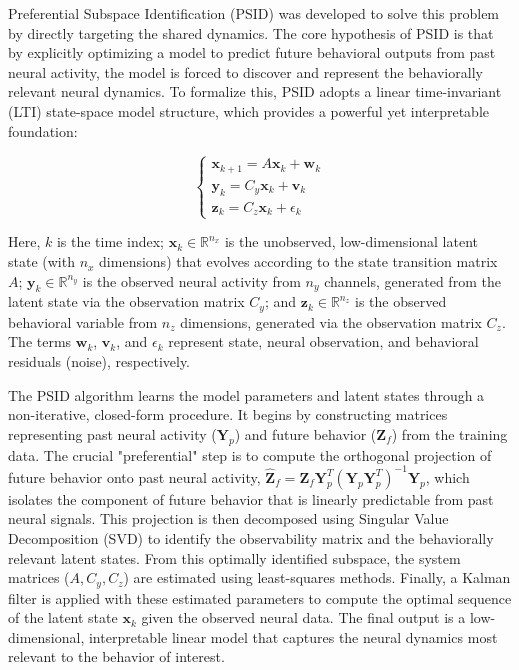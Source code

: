 \documentclass[12pt, a4paper]{article}
\begin{document}
Preferential Subspace Identification (PSID) was developed to solve this problem by directly targeting the shared dynamics. The core hypothesis of PSID is that by explicitly optimizing a model to predict future behavioral outputs from past neural activity, the model is forced to discover and represent the behaviorally relevant neural dynamics. To formalize this, PSID adopts a linear time-invariant (LTI) state-space model structure, which provides a powerful yet interpretable foundation:

$$
\begin{cases}
\mathbf{x}_{k+1} = A \mathbf{x}_k + \mathbf{w}_k \\
\mathbf{y}_k = C_y \mathbf{x}_k + \mathbf{v}_k \\
\mathbf{z}_k = C_z \mathbf{x}_k + \epsilon_k
\end{cases}
$$

Here, $k$ is the time index; $\mathbf{x}_k \in \mathbb{R}^{n_x}$ is the unobserved, low-dimensional latent state (with $n_x$ dimensions) that evolves according to the state transition matrix $A$; $\mathbf{y}_k \in \mathbb{R}^{n_y}$ is the observed neural activity from $n_y$ channels, generated from the latent state via the observation matrix $C_y$; and $\mathbf{z}_k \in \mathbb{R}^{n_z}$ is the observed behavioral variable from $n_z$ dimensions, generated via the observation matrix $C_z$. The terms $\mathbf{w}_k$, $\mathbf{v}_k$, and $\epsilon_k$ represent state, neural observation, and behavioral residuals (noise), respectively.

The PSID algorithm learns the model parameters and latent states through a non-iterative, closed-form procedure. It begins by constructing  matrices representing past neural activity ($\mathbf{Y}_p$) and future behavior ($\mathbf{Z}_f$) from the training data. The crucial "preferential" step is to compute the orthogonal projection of future behavior onto past neural activity, $\hat{\mathbf{Z}}_f = \mathbf{Z}_f \mathbf{Y}_p^T (\mathbf{Y}_p \mathbf{Y}_p^T)^{-1} \mathbf{Y}_p$, which isolates the component of future behavior that is linearly predictable from past neural signals. This projection is then decomposed using Singular Value Decomposition (SVD) to identify the observability matrix and the behaviorally relevant latent states. From this optimally identified subspace, the system matrices ($A, C_y, C_z$) are estimated using least-squares methods. Finally, a Kalman filter is applied with these estimated parameters to compute the optimal sequence of the latent state $\mathbf{x}_k$ given the observed neural data. The final output is a low-dimensional, interpretable linear model that captures the neural dynamics most relevant to the behavior of interest.
\end{document}
